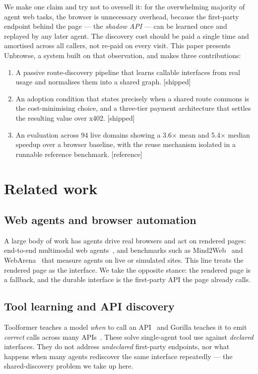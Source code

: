 \documentclass[11pt]{article}
\newcommand{\impl}{\textcolor{green!55!black}{\small[shipped]}}
\newcommand{\refimpl}{\textcolor{blue!70!black}{\small[reference]}}
\begin{document}
We make one claim and try not to oversell it: for the overwhelming majority of
agent web tasks, the browser is unnecessary overhead, because the first-party
endpoint behind the page --- the \emph{shadow API} --- can be learned once and
replayed by any later agent. The discovery cost should be paid a single time and
amortised across all callers, not re-paid on every visit. This paper presents
Unbrowse, a system built on that observation, and makes three contributions:
\begin{enumerate}[leftmargin=1.6em]
  \item A passive route-discovery pipeline that learns callable interfaces from
  real usage and normalises them into a shared graph. \impl
  \item An adoption condition that states precisely when a shared route commons is
  the cost-minimising choice, and a three-tier payment architecture that settles
  the resulting value over x402. \impl
  \item An evaluation across 94 live domains showing a 3.6$\times$ mean and
  5.4$\times$ median speedup over a browser baseline, with the reuse mechanism
  isolated in a runnable reference benchmark. \refimpl
\end{enumerate}

\section{Related work}
\subsection{Web agents and browser automation}
A large body of work has agents drive real browsers and act on rendered pages:
end-to-end multimodal web agents~\cite{webvoyager}, and benchmarks such as
Mind2Web~\cite{mind2web} and WebArena~\cite{webarena} that measure agents on live
or simulated sites. This line treats the rendered page as the interface. We take
the opposite stance: the rendered page is a fallback, and the durable interface is
the first-party API the page already calls.

\subsection{Tool learning and API discovery}
Toolformer teaches a model \emph{when} to call an API~\cite{toolformer} and Gorilla
teaches it to emit \emph{correct} calls across many APIs~\cite{gorilla}. These
solve single-agent tool use against \emph{declared} interfaces. They do not address
\emph{undeclared} first-party endpoints, nor what happens when many agents
rediscover the same interface repeatedly --- the shared-discovery problem we take
up here.
\end{document}
